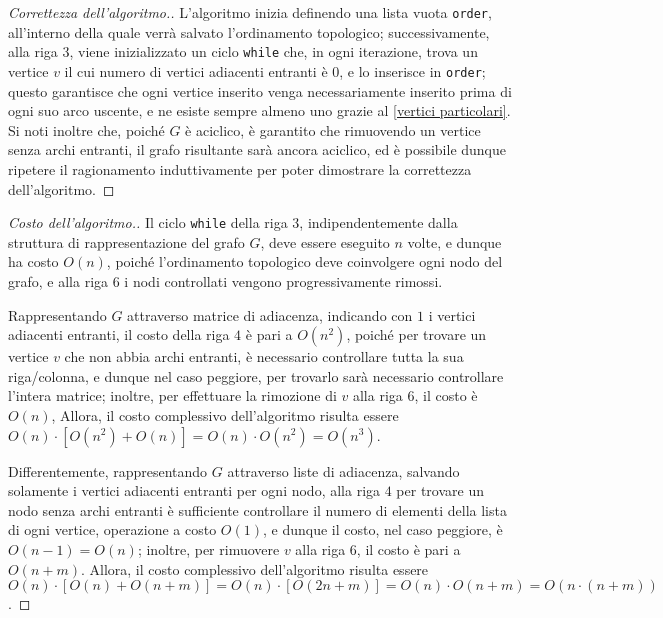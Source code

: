 \documentclass[a4paper, 12pt]{report}
\begin{document}
    \begin{proof}[Correttezza dell'algoritmo.]
        L'algoritmo inizia definendo una lista vuota \texttt{order}, all'interno della quale verrà salvato l'ordinamento topologico; successivamente, alla riga $3$, viene inizializzato un ciclo \texttt{while} che, in ogni iterazione, trova un vertice $v$ il cui numero di vertici adiacenti entranti è $0$, e lo inserisce in \texttt{order}; questo garantisce che ogni vertice inserito venga necessariamente inserito prima di ogni suo arco uscente, e ne esiste sempre almeno uno grazie al \cref{vertici particolari}. Si noti inoltre che, poiché $G$ è aciclico, è garantito che rimuovendo un vertice senza archi entranti, il grafo risultante sarà ancora aciclico, ed è possibile dunque ripetere il ragionamento induttivamente per poter dimostrare la correttezza dell'algoritmo.
    \end{proof}

    \begin{proof}[Costo dell'algoritmo.]
        Il ciclo \texttt{while} della riga $3$, indipendentemente dalla struttura di rappresentazione del grafo $G$, deve essere eseguito $n$ volte, e dunque ha costo $O(n)$, poiché l'ordinamento topologico deve coinvolgere ogni nodo del grafo, e alla riga $6$ i nodi controllati vengono progressivamente rimossi.

        Rappresentando $G$ attraverso matrice di adiacenza, indicando con $1$ i vertici adiacenti entranti, il costo della riga $4$ è pari a $O(n^2)$, poiché per trovare un vertice $v$ che non abbia archi entranti, è necessario controllare tutta la sua riga/colonna, e dunque nel caso peggiore, per trovarlo sarà necessario controllare l'intera matrice; inoltre, per effettuare la rimozione di $v$ alla riga $6$, il costo è $O(n)$, Allora, il costo complessivo dell'algoritmo risulta essere $O(n) \cdot [O(n^2) + O(n)]= O(n) \cdot O(n^2) = O(n^3)$.

        Differentemente, rappresentando $G$ attraverso liste di adiacenza, salvando solamente i vertici adiacenti entranti per ogni nodo, alla riga $4$ per trovare un nodo senza archi entranti è sufficiente controllare il numero di elementi della lista di ogni vertice, operazione a costo $O(1)$, e dunque il costo, nel caso peggiore, è $O(n - 1) = O(n)$; inoltre, per rimuovere $v$ alla riga $6$, il costo è pari a $O(n + m)$. Allora, il costo complessivo dell'algoritmo risulta essere $O(n) \cdot [O(n) + O(n + m)] = O(n) \cdot [O(2n + m)] = O(n) \cdot O(n + m) = O(n \cdot (n +m))$.
    \end{proof}
\end{document}
